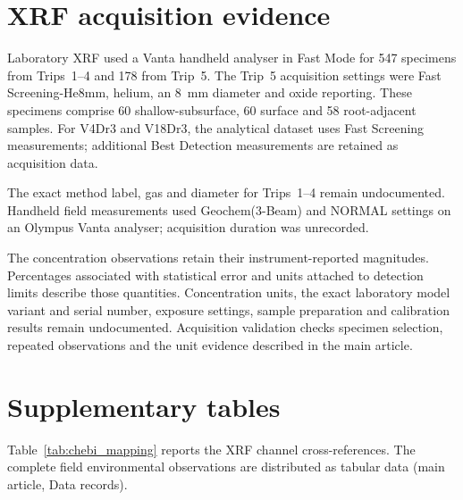 \documentclass[sn-mathphys-num]{sn-jnl}
\begin{document}
\section{XRF acquisition evidence}\label{supp:xrf_acquisition}

Laboratory XRF used a Vanta handheld analyser in Fast Mode for 547
specimens from Trips~1--4 and 178 from Trip~5. The Trip~5 acquisition
settings were Fast Screening-He8mm, helium, an 8~mm diameter and oxide
reporting. These specimens comprise 60 shallow-subsurface, 60 surface
and 58 root-adjacent samples. For V4Dr3 and V18Dr3, the analytical
dataset uses Fast Screening measurements; additional Best Detection
measurements are retained as acquisition data.

The exact method label, gas and diameter for Trips~1--4 remain
undocumented. Handheld field measurements used Geochem(3-Beam) and
NORMAL settings on an Olympus Vanta analyser; acquisition duration
was unrecorded.

The concentration observations retain their instrument-reported magnitudes.
Percentages associated with statistical error and units attached to
detection limits describe those quantities. Concentration units, the exact
laboratory model variant and serial number, exposure settings, sample
preparation and calibration results remain undocumented. Acquisition
validation checks specimen selection, repeated observations and the
unit evidence described in the main article.

\section{Supplementary tables}

Table~\ref{tab:chebi_mapping} reports the XRF channel cross-references.
The complete field environmental observations are distributed as tabular
data (main article, Data records).



\begin{landscape}
\pagestyle{empty}
\setlength{\LTcapwidth}{\textheight}

\end{landscape}


\end{document}
